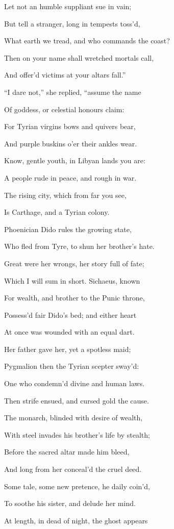 Let not an humble suppliant sue in vain;

But tell a stranger, long in tempests toss’d,

What earth we tread, and who commands the coast?

Then on your name shall wretched mortals call,

And offer’d victims at your altars fall.”

“I dare not,” she replied, “assume the name

Of goddess, or celestial honours claim:

For Tyrian virgins bows and quivers bear,

And purple buskins o’er their ankles wear.

Know, gentle youth, in Libyan lands you are:

A people rude in peace, and rough in war.

The rising city, which from far you see,

Is Carthage, and a Tyrian colony.

Phoenician Dido rules the growing state,

Who fled from Tyre, to shun her brother’s hate.

Great were her wrongs, her story full of fate;

Which I will sum in short. Sichaeus, known

For wealth, and brother to the Punic throne,

Possess’d fair Dido’s bed; and either heart

At once was wounded with an equal dart.

Her father gave her, yet a spotless maid;

Pygmalion then the Tyrian scepter sway’d:

One who condemn’d divine and human laws.

Then strife ensued, and cursed gold the cause.

The monarch, blinded with desire of wealth,

With steel invades his brother’s life by stealth;

Before the sacred altar made him bleed,

And long from her conceal’d the cruel deed.

Some tale, some new pretence, he daily coin’d,

To soothe his sister, and delude her mind.

At length, in dead of night, the ghost appears

